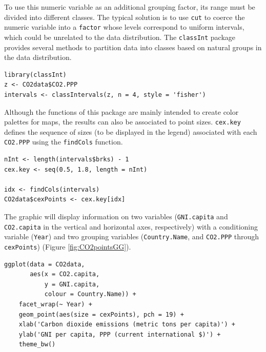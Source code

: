 To use this numeric variable as an additional grouping factor, its range must be divided into different classes. The typical solution is to use \texttt{cut} to coerce the numeric variable into a \texttt{factor} whose levels correspond to uniform intervals, which could be unrelated to the data distribution. The \texttt{classInt} package \cite{Bivand2013} provides several methods to partition data into classes based on natural groups in the data distribution.


\lstset{language=r,label= ,caption= ,captionpos=b,numbers=none}
\begin{lstlisting}
library(classInt)
z <- CO2data$CO2.PPP
intervals <- classIntervals(z, n = 4, style = 'fisher')
\end{lstlisting}

Although the functions of this package are mainly intended to create color palettes for maps, the results can also be associated to point sizes. \texttt{cex.key} defines the sequence of sizes (to be displayed in the legend) associated with each \texttt{CO2.PPP} using the \texttt{findCols} function.
\lstset{language=r,label= ,caption= ,captionpos=b,numbers=none}
\begin{lstlisting}
nInt <- length(intervals$brks) - 1
cex.key <- seq(0.5, 1.8, length = nInt)

idx <- findCols(intervals)
CO2data$cexPoints <- cex.key[idx]
\end{lstlisting}

The graphic will display information on two variables (\texttt{GNI.capita} and \texttt{CO2.capita} in the vertical and horizontal axes, respectively) with a conditioning variable (\texttt{Year}) and two grouping variables (\texttt{Country.Name}, and \texttt{CO2.PPP} through \texttt{cexPoints}) (Figure \ref{fig:CO2pointsGG}).

\lstset{language=r,label= ,caption= ,captionpos=b,numbers=none}
\begin{lstlisting}
ggplot(data = CO2data,
       aes(x = CO2.capita,
           y = GNI.capita,
           colour = Country.Name)) +
    facet_wrap(~ Year) +
    geom_point(aes(size = cexPoints), pch = 19) +
    xlab('Carbon dioxide emissions (metric tons per capita)') +
    ylab('GNI per capita, PPP (current international $)') +
    theme_bw()
\end{lstlisting}

